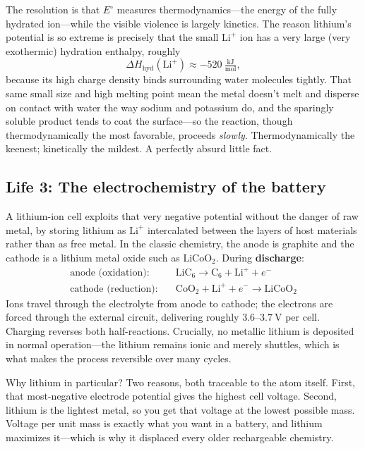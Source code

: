 \documentclass[11pt, letterpaper]{article}
\newcommand{\Lip}{\text{Li}^{+}}
\begin{document}
The resolution is that $E^\circ$ measures thermodynamics---the energy of the fully hydrated ion---while the visible violence is largely kinetics. The reason lithium's potential is so extreme is precisely that the small $\Lip$ ion has a very large (very exothermic) hydration enthalpy, roughly
\begin{equation}
  \Delta H_{\text{hyd}}(\Lip) \approx -520\ \tfrac{\text{kJ}}{\text{mol}},
\end{equation}
because its high charge density binds surrounding water molecules tightly. That same small size and high melting point mean the metal doesn't melt and disperse on contact with water the way sodium and potassium do, and the sparingly soluble  product tends to coat the surface---so the reaction, though thermodynamically the most favorable, proceeds \textit{slowly}. Thermodynamically the keenest; kinetically the mildest. A perfectly absurd little fact.

\subsection{Life 3: The electrochemistry of the battery}

A lithium-ion cell exploits that very negative potential without the danger of raw metal, by storing lithium as $\Lip$ intercalated between the layers of host materials rather than as free metal. In the classic chemistry, the anode is graphite and the cathode is a lithium metal oxide such as $\text{LiCoO}_2$. During \textbf{discharge}:
\begin{align}
  \text{anode (oxidation):} \quad & \text{LiC}_6 \rightarrow \text{C}_6 + \Lip + e^- \\[2pt]
  \text{cathode (reduction):} \quad & \text{CoO}_2 + \Lip + e^- \rightarrow \text{LiCoO}_2
\end{align}
Ions travel through the electrolyte from anode to cathode; the electrons are forced through the external circuit, delivering roughly $3.6$--$3.7\ \text{V}$ per cell. Charging reverses both half-reactions. Crucially, no metallic lithium is deposited in normal operation---the lithium remains ionic and merely shuttles, which is what makes the process reversible over many cycles.

Why lithium in particular? Two reasons, both traceable to the atom itself. First, that most-negative electrode potential gives the highest cell voltage. Second, lithium is the lightest metal, so you get that voltage at the lowest possible mass. Voltage per unit mass is exactly what you want in a battery, and lithium maximizes it---which is why it displaced every older rechargeable chemistry.
\end{document}
